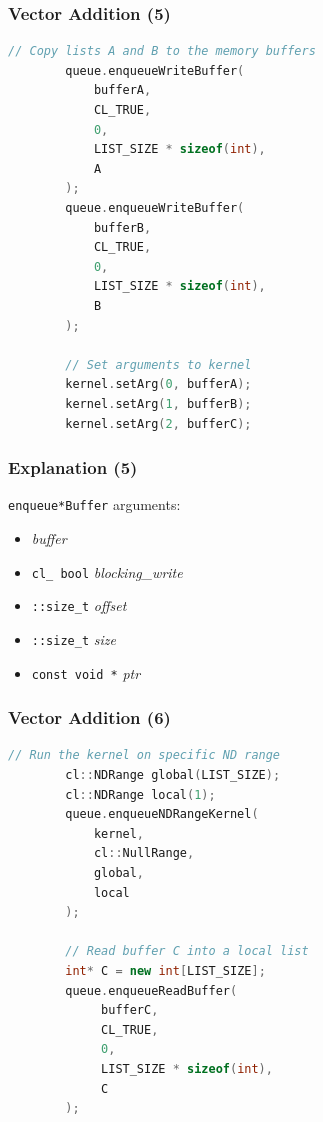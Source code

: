 \begin{frame}[fragile]
  \frametitle{Vector Addition (5)}

  \begin{lstlisting}[language=C++]
        // Copy lists A and B to the memory buffers
        queue.enqueueWriteBuffer(
            bufferA,
            CL_TRUE,
            0,
            LIST_SIZE * sizeof(int),
            A
        );
        queue.enqueueWriteBuffer(
            bufferB,
            CL_TRUE,
            0,
            LIST_SIZE * sizeof(int),
            B
        );
 
        // Set arguments to kernel
        kernel.setArg(0, bufferA);
        kernel.setArg(1, bufferB);
        kernel.setArg(2, bufferC);
  \end{lstlisting}

\end{frame}

\begin{frame}
  \frametitle{Explanation (5)}


  {\tt enqueue*Buffer} arguments:

  \begin{itemize}
    \item {\it buffer}
    \item {\tt cl\_ bool} {\it blocking\_write}
    \item {\tt ::size\_t} {\it offset}
    \item {\tt ::size\_t} {\it size}
    \item {\tt const void *} {\it ptr}
  \end{itemize}

\end{frame}

\begin{frame}[fragile]
  \frametitle{Vector Addition (6)}


  \begin{lstlisting}[language=C++]
        // Run the kernel on specific ND range
        cl::NDRange global(LIST_SIZE);
        cl::NDRange local(1);
        queue.enqueueNDRangeKernel(
            kernel,
            cl::NullRange,
            global,
            local
        );
 
        // Read buffer C into a local list
        int* C = new int[LIST_SIZE];
        queue.enqueueReadBuffer(
             bufferC,
             CL_TRUE,
             0,
             LIST_SIZE * sizeof(int),
             C
        );
  \end{lstlisting}

\end{frame}

